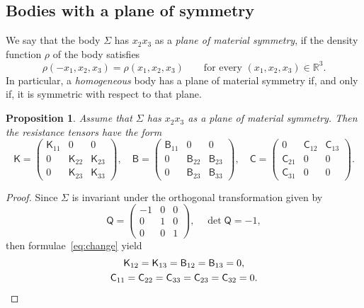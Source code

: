 \documentclass[final]{amsart}
\newtheorem{prop}[thm]{Proposition}
\theoremstyle{definition}
\theoremstyle{definition}
\theoremstyle{remark}
\begin{document}
\subsection{Bodies with a plane of symmetry}
We say that the body ${\Sigma}$ has $x_2x_3$ as a {\em plane of
  material symmetry}, if the density function $\rho$ of the body satisfies
\[
\rho(-x_1,x_2,x_3)=\rho(x_1,x_2,x_3)\qquad\text{for every
  $(x_1,x_2,x_3)\in{\mathbb R}^3$}.
\]
In particular, a {\em homogeneous} body has a plane of material symmetry if,
and only if, it is symmetric with respect to that plane.
\begin{prop}\label{prop:planesym}
  Assume that ${\Sigma}$ has $x_2x_3$ as a plane of material symmetry. Then
  the resistance tensors have the form
\[
{\mathsf K}=
\begin{pmatrix}
{\mathsf K}_{11} & 0 & 0\\
0 & {\mathsf K}_{22} & {\mathsf K}_{23}\\
0 & {\mathsf K}_{23} & {\mathsf K}_{33}
\end{pmatrix},\quad
{\mathsf B}=
\begin{pmatrix}
{\mathsf B}_{11} & 0 & 0\\
0 & {\mathsf B}_{22} & {\mathsf B}_{23}\\
0 & {\mathsf B}_{23} & {\mathsf B}_{33}
\end{pmatrix},\quad
{\mathsf C}=
\begin{pmatrix}
0 & {\mathsf C}_{12} & {\mathsf C}_{13}\\
{\mathsf C}_{21} & 0 & 0\\
{\mathsf C}_{31} & 0 & 0
\end{pmatrix}.
\]
\end{prop}
\begin{proof}
  Since $\Sigma$ is invariant under the orthogonal transformation
  given by
\[
{\mathsf Q}=
\begin{pmatrix}
-1 & 0 & 0\\
0 & 1 & 0\\
0 & 0 & 1
\end{pmatrix},\quad
\det {\mathsf Q} = -1,
\]
then formulae~\eqref{eq:change} yield
\begin{gather*}
{\mathsf K}_{12}={\mathsf K}_{13}={\mathsf B}_{12}={\mathsf B}_{13}=0,\\
{\mathsf C}_{11}={\mathsf C}_{22}={\mathsf C}_{33}={\mathsf C}_{23}={\mathsf C}_{32}=0.\qedhere
\end{gather*}
\end{proof}
\end{document}
